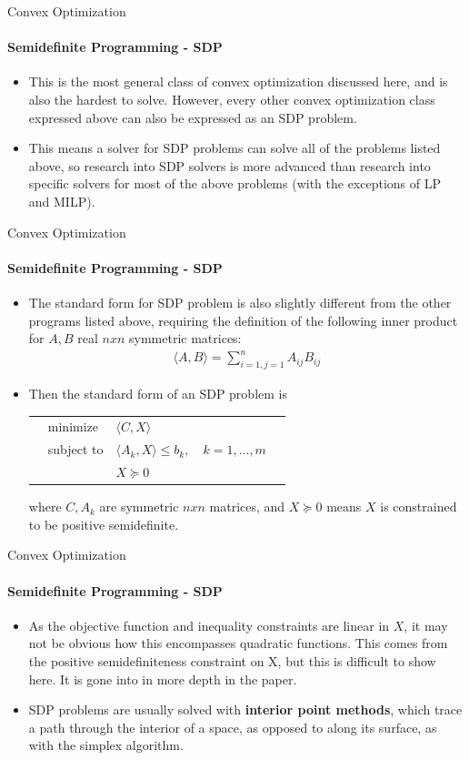 \documentclass{beamer}
\begin{document}
	\begin{frame}{Convex Optimization}
		\framesubtitle{Semidefinite Programming - SDP}
		\begin{itemize}
			\item This is the most general class of convex optimization discussed here, and is also the hardest to solve. However, every other convex optimization class expressed above can also be expressed as an SDP problem.
			\item This means a solver for SDP problems can solve all of the problems listed above, so research into SDP solvers is more advanced than research into specific solvers for most of the above problems (with the exceptions of LP and MILP).
		\end{itemize}
	\end{frame}
	
	\begin{frame}{Convex Optimization}
		\framesubtitle{Semidefinite Programming - SDP}
		\begin{itemize}
			\item The standard form for SDP problem is also slightly different from the other programs listed above, requiring the definition of the following inner product for $A, B$ real $nxn$ symmetric matrices:
			\begin{align*}
				\langle A,B\rangle = \sum_{i=1,j=1}^{n}A_{ij}B_{ij}
			\end{align*}
			\item Then the standard form of an SDP problem is 
			\begin{tabularx}{\textwidth}{X l l l X}
				& minimize		& $\langle C,X\rangle$	& &\\
				& subject to	& $\langle A_k,X\rangle \leq b_k,$	& $k=1,...,m$ &\\
				&				& $X\succeq 0$ &  &
			\end{tabularx}
			where $C, A_k$ are symmetric $nxn$ matrices, and $X\succeq 0$ means $X$ is constrained to be positive semidefinite.
		\end{itemize}
	\end{frame}

	\begin{frame}{Convex Optimization}
		\framesubtitle{Semidefinite Programming - SDP}
		\begin{itemize}
			\item As the objective function and inequality constraints are linear in $X$, it may not be obvious how this encompasses quadratic functions. This comes from the positive semidefiniteness constraint on X, but this is difficult to show here. It is gone into in more depth in the paper.
			\item SDP problems are usually solved with \textbf{interior point methods}, which trace a path through the interior of a space, as opposed to along its surface, as with the simplex algorithm.
		\end{itemize}
	\end{frame}
	
\end{document}
